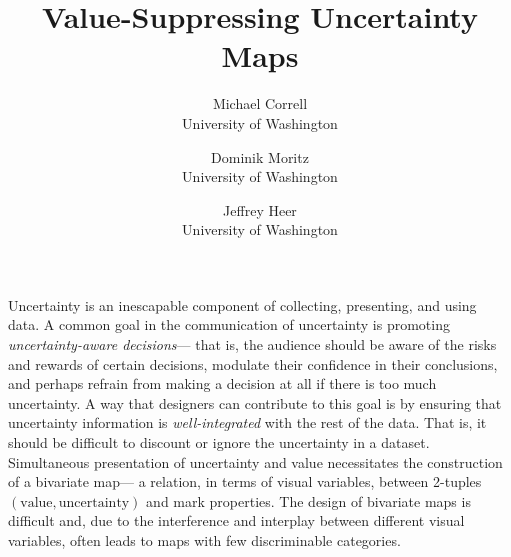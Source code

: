 \documentclass{vgtc}                          %
\title{Value-Suppressing Uncertainty Maps}
\author{Michael Correll\\ %
        \scriptsize University of Washington %
\and Dominik Moritz\\ %
     \scriptsize University of Washington %
\and Jeffrey Heer\\ %
     \scriptsize University of Washington}
\begin{document}


\maketitle




Uncertainty is an inescapable component of collecting, presenting, and using data. A common goal in the communication of uncertainty is promoting \emph{uncertainty-aware decisions}--- that is, the audience should be aware of the risks and rewards of certain decisions, modulate their confidence in their conclusions, and perhaps refrain from making a decision at all if there is too much uncertainty.  A way that designers can contribute to this goal is by ensuring that uncertainty information is \emph{well-integrated} with the rest of the data. That is, it should be difficult to discount or ignore the uncertainty in a dataset. Simultaneous presentation of uncertainty and value necessitates the construction of a bivariate map--- a relation, in terms of visual variables, between 2-tuples $(\text{value}, \text{uncertainty})$ and mark properties. The design of bivariate maps is difficult and, due to the interference and interplay between different visual variables, often leads to maps with few discriminable categories. 
\end{document}
